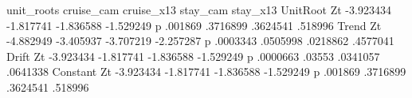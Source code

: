 	unit_roots			
	cruise_cam	cruise_x13	stay_cam	stay_x13
UnitRoot				
Zt	-3.923434	-1.817741	-1.836588	-1.529249
p	.001869	.3716899	.3624541	.518996
Trend				
Zt	-4.882949	-3.405937	-3.707219	-2.257287
p	.0003343	.0505998	.0218862	.4577041
Drift				
Zt	-3.923434	-1.817741	-1.836588	-1.529249
p	.0000663	.03553	.0341057	.0641338
Constant				
Zt	-3.923434	-1.817741	-1.836588	-1.529249
p	.001869	.3716899	.3624541	.518996
